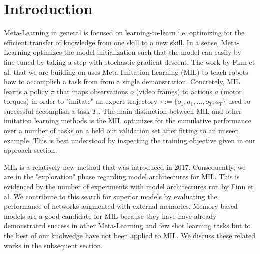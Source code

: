 \section{Introduction}

Meta-Learning in general is focused on learning-to-learn i.e. optimizing for the 
efficient transfer of knowledge from one skill to a new skill. In a sense, 
Meta-Learning optimizes the model initialization such that the model can easily 
by fine-tuned by taking a step with stochastic gradient descent.
The work by Finn et al. that we are building on uses Meta Imitation Learning (MIL)
to teach robots how to accomplish a task from 
from a single demonstration. Concretely, MIL learns a policy $\pi$ that maps 
observations $o$ (video frames) to actions $a$ (motor torques) in 
order to "imitate" an expert trajectory $\tau := \{o_1, a_1, \dots, o_T, a_T \}$
used to successful accomplish a task $T_i$. The main distinction between 
MIL and other imitation learning methods is the MIL optimizes for the cumulative
performance over a number of tasks on a held out validation set after fitting
to an unseen example. This is best understood by inspecting the training objective
given in our approach section.

MIL is a relatively new method that was introduced in 2017. Consequently, we are
in the "exploration" phase regarding model architectures for MIL.
This is evidenced by the number of experiments with model architectures run by Finn et al.
We contribute to this search for superior models by evaluating the performance of 
networks augmented with external memories. Memory based models are a good candidate for 
MIL because they have have already demonstrated success in other Meta-Learning and
few shot learning tasks but to the best of our knolwedge have not been applied to MIL.
We discuss these related works in the subsequent section.

